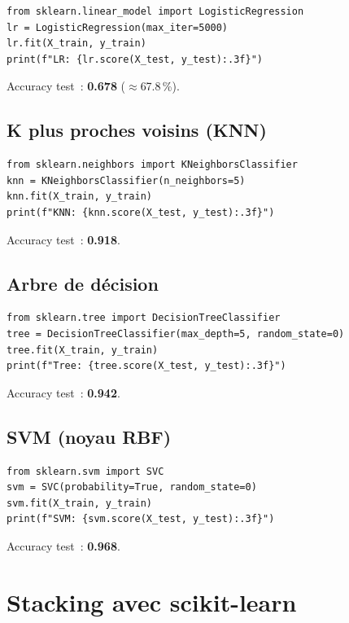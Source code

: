 \documentclass[a4paper,11pt]{article}
\begin{document}
\begin{lstlisting}
from sklearn.linear_model import LogisticRegression
lr = LogisticRegression(max_iter=5000)
lr.fit(X_train, y_train)
print(f"LR: {lr.score(X_test, y_test):.3f}")
\end{lstlisting}

\noindent Accuracy test~: \textbf{0.678} ($\approx$67.8\,\%).

\subsection{K plus proches voisins (KNN)}

\begin{lstlisting}
from sklearn.neighbors import KNeighborsClassifier
knn = KNeighborsClassifier(n_neighbors=5)
knn.fit(X_train, y_train)
print(f"KNN: {knn.score(X_test, y_test):.3f}")
\end{lstlisting}

\noindent Accuracy test~: \textbf{0.918}.

\subsection{Arbre de d\'ecision}

\begin{lstlisting}
from sklearn.tree import DecisionTreeClassifier
tree = DecisionTreeClassifier(max_depth=5, random_state=0)
tree.fit(X_train, y_train)
print(f"Tree: {tree.score(X_test, y_test):.3f}")
\end{lstlisting}

\noindent Accuracy test~: \textbf{0.942}.

\subsection{SVM (noyau RBF)}

\begin{lstlisting}
from sklearn.svm import SVC
svm = SVC(probability=True, random_state=0)
svm.fit(X_train, y_train)
print(f"SVM: {svm.score(X_test, y_test):.3f}")
\end{lstlisting}

\noindent Accuracy test~: \textbf{0.968}.

\section{Stacking avec scikit-learn}
\end{document}
